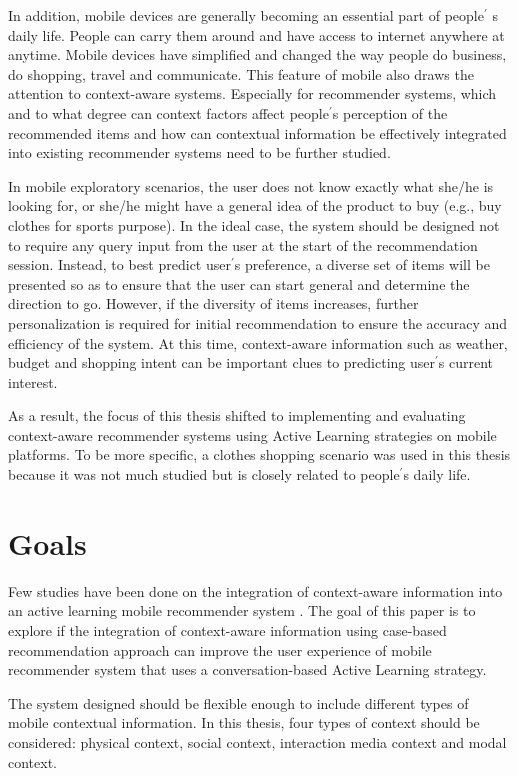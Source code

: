 In addition, mobile devices are generally becoming an essential part of people$^\prime$ s daily life. People can carry them around and have access to internet anywhere at anytime. Mobile devices have simplified and changed the way people do business, do shopping, travel and communicate. This feature of mobile also draws the attention to context-aware systems. Especially for recommender systems, which and to what degree can context factors affect people$^\prime$s perception of the recommended items and how can contextual information be effectively integrated into existing recommender systems need to be further studied. 

In mobile exploratory scenarios, the user does not know exactly what she/he is looking for, or she/he might have a general idea of the product to buy (e.g., buy clothes for sports purpose). In the ideal case, the system should be designed not to require any query input from the user at the start of the recommendation session. Instead, to best predict user$^\prime$s preference, a diverse set of items will be presented so as to ensure that the user can start general and determine the direction to go. However, if the diversity of items increases, further personalization is required for initial recommendation to ensure the accuracy and efficiency of the system. At this time, context-aware information such as weather, budget and shopping intent can be important clues to predicting user$^\prime$s current interest. 

As a result, the focus of this thesis shifted to implementing and evaluating context-aware recommender systems using Active Learning strategies on mobile platforms. To be more specific, a clothes shopping scenario was used in this thesis because it was not much studied but is closely related to people$^\prime$s daily life.

\section{Goals} \label{sec:gl}

Few studies have been done on the integration of context-aware information into an active learning mobile recommender system \cite{ref:5, ref:12, ref:26}. The goal of this paper is to explore if the integration of context-aware information using case-based recommendation approach can improve the user experience of mobile recommender system that uses a conversation-based Active Learning strategy.

The system designed should be flexible enough to include different types of mobile contextual information. In this thesis, four types of context should be considered: physical context, social context, interaction media context and modal context.

